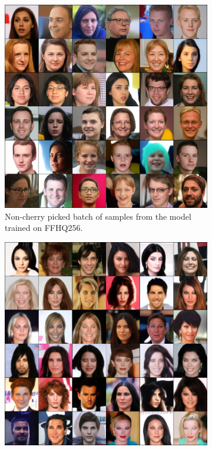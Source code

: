 \begin{figure}[ht]
    \centering
    \begin{subfigure}[b]{0.47\textwidth}
        \centering
        \includegraphics[width=1.0\textwidth]{figures/ffhq256-samples-small.png}
        \caption{
            Non-cherry picked batch of samples from the model trained on FFHQ256.
        }
    \end{subfigure}
    \hfill
    \begin{subfigure}[b]{0.47\textwidth}
        \centering
        \includegraphics[width=1.0\textwidth]{figures/celeba-samples-small.png}

\end{subfigure}
\end{figure}
